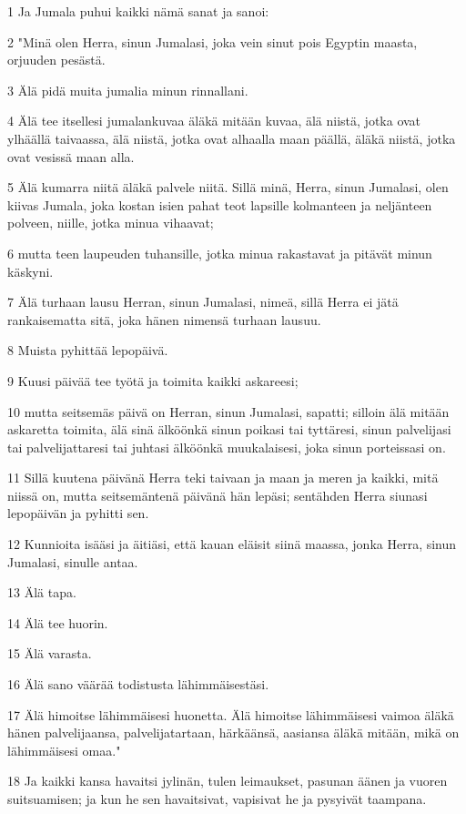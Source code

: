 \par 1 Ja Jumala puhui kaikki nämä sanat ja sanoi:
\par 2 "Minä olen Herra, sinun Jumalasi, joka vein sinut pois Egyptin maasta, orjuuden pesästä.
\par 3 Älä pidä muita jumalia minun rinnallani.
\par 4 Älä tee itsellesi jumalankuvaa äläkä mitään kuvaa, älä niistä, jotka ovat ylhäällä taivaassa, älä niistä, jotka ovat alhaalla maan päällä, äläkä niistä, jotka ovat vesissä maan alla.
\par 5 Älä kumarra niitä äläkä palvele niitä. Sillä minä, Herra, sinun Jumalasi, olen kiivas Jumala, joka kostan isien pahat teot lapsille kolmanteen ja neljänteen polveen, niille, jotka minua vihaavat;
\par 6 mutta teen laupeuden tuhansille, jotka minua rakastavat ja pitävät minun käskyni.
\par 7 Älä turhaan lausu Herran, sinun Jumalasi, nimeä, sillä Herra ei jätä rankaisematta sitä, joka hänen nimensä turhaan lausuu.
\par 8 Muista pyhittää lepopäivä.
\par 9 Kuusi päivää tee työtä ja toimita kaikki askareesi;
\par 10 mutta seitsemäs päivä on Herran, sinun Jumalasi, sapatti; silloin älä mitään askaretta toimita, älä sinä älköönkä sinun poikasi tai tyttäresi, sinun palvelijasi tai palvelijattaresi tai juhtasi älköönkä muukalaisesi, joka sinun porteissasi on.
\par 11 Sillä kuutena päivänä Herra teki taivaan ja maan ja meren ja kaikki, mitä niissä on, mutta seitsemäntenä päivänä hän lepäsi; sentähden Herra siunasi lepopäivän ja pyhitti sen.
\par 12 Kunnioita isääsi ja äitiäsi, että kauan eläisit siinä maassa, jonka Herra, sinun Jumalasi, sinulle antaa.
\par 13 Älä tapa.
\par 14 Älä tee huorin.
\par 15 Älä varasta.
\par 16 Älä sano väärää todistusta lähimmäisestäsi.
\par 17 Älä himoitse lähimmäisesi huonetta. Älä himoitse lähimmäisesi vaimoa äläkä hänen palvelijaansa, palvelijatartaan, härkäänsä, aasiansa äläkä mitään, mikä on lähimmäisesi omaa."
\par 18 Ja kaikki kansa havaitsi jylinän, tulen leimaukset, pasunan äänen ja vuoren suitsuamisen; ja kun he sen havaitsivat, vapisivat he ja pysyivät taampana.
